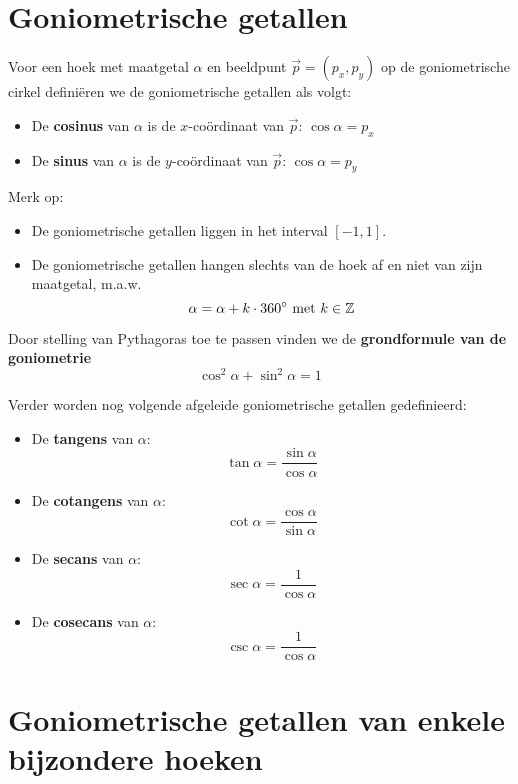 \documentclass[a4paper,12pt]{article}
\begin{document}
\onehalfspacing

\section{Goniometrische getallen}

\begin{theorie}

Voor een hoek met maatgetal $\alpha$ en beeldpunt $\vec{p}=(p_x,p_y)$ op de goniometrische cirkel definiëren we de goniometrische getallen als volgt:

\begin{itemize}
  \item De {\bf cosinus} van $\alpha$ is de $x$-coördinaat van $\vec{p}$: $\cos\alpha=p_x$
  \item De {\bf sinus} van $\alpha$ is de $y$-coördinaat van $\vec{p}$: $\cos\alpha=p_y$
\end{itemize}

Merk op:
\begin{itemize}
  \item De goniometrische getallen liggen in het interval $[-1,1]$.
  \item De goniometrische getallen hangen slechts van de hoek af en niet van zijn maatgetal, m.a.w.
  $$\alpha = \alpha + k\cdot 360^\circ\mbox{ met }k\in\mathbb{Z}$$
\end{itemize}

Door stelling van Pythagoras toe te passen vinden we de {\bf grondformule van de goniometrie}
$$\cos^2\alpha + \sin^2\alpha = 1$$

Verder worden nog volgende afgeleide goniometrische getallen gedefinieerd:
\begin{itemize}
  \item De {\bf tangens} van $\alpha$:
  $$\tan\alpha=\dfrac{\sin\alpha}{\cos\alpha}$$
  \item De {\bf cotangens} van $\alpha$:
  $$\cot\alpha=\dfrac{\cos\alpha}{\sin\alpha}$$
  \item De {\bf secans} van $\alpha$:
  $$\sec\alpha=\dfrac{1}{\cos\alpha}$$
  \item De {\bf cosecans} van $\alpha$:
  $$\csc\alpha=\dfrac{1}{\cos\alpha}$$
\end{itemize}

\end{theorie}

\pagebreak
\section{Goniometrische getallen van enkele bijzondere hoeken}
\end{document}
